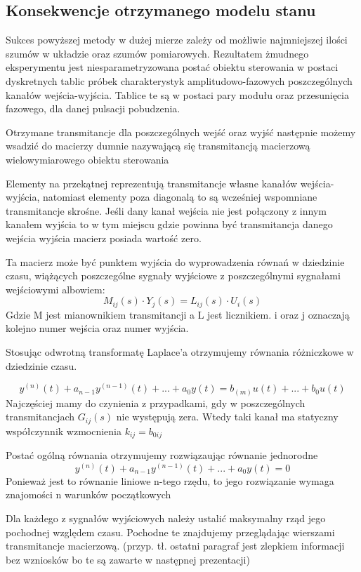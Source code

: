 \documentclass{article}
\begin{document}
	\subsection{Konsekwencje otrzymanego modelu stanu}

		Sukces powyższej metody w dużej mierze zależy od możliwie najmniejszej ilości
		szumów w układzie oraz szumów pomiarowych. Rezultatem żmudnego eksperymentu
		jest niesparametryzowana postać obiektu sterowania w postaci dyskretnych tablic
		próbek charakterystyk amplitudowo-fazowych poszczególnych kanałów wejścia-wyjścia.
		Tablice te są w postaci pary modułu oraz przesunięcia fazowego, dla danej pulsacji
		pobudzenia.

		Otrzymane transmitancje dla poszczególnych wejść oraz wyjść następnie możemy
		wsadzić do macierzy dumnie nazywającą się transmitancją macierzową
		wielowymiarowego obiektu sterowania

		Elementy na przekątnej reprezentują transmitancje własne kanałów
		wejścia-wyjścia, natomiast elementy poza diagonalą to są
		wcześniej wspomniane transmitancje skrośne. Jeśli dany kanał wejścia nie jest
		połączony z innym kanałem wyjścia to w tym miejscu gdzie powinna być
		transmitancja danego wejścia wyjścia macierz posiada wartość zero.

		Ta macierz może być punktem wyjścia do wyprowadzenia równań w dziedzinie czasu,
		wiążących poszczególne sygnały wyjściowe z poszczególnymi sygnałami wejściowymi albowiem:
		\begin{equation}
			 M_{ij}(s) \cdot Y_{j}(s) = L_{ij}(s) \cdot U_{i}(s) 
		\end{equation}
		Gdzie M jest mianownikiem transmitancji a L jest licznikiem.
		i oraz j oznaczają kolejno numer wejścia oraz numer wyjścia.

		Stosując odwrotną transformatę Laplace'a otrzymujemy równania różniczkowe w
		dziedzinie czasu.

		\begin{equation}
			y^{(n)}(t) + a_{n-1} y^{(n-1)}(t) + ... +   a_{0} y(t) = b_{(m)} u(t) + ... + b_{0} u(t)
		\end{equation}
		Najczęściej mamy do czynienia z przypadkami, gdy w poszczególnych
		transmitancjach $G_{ij}(s)$ nie występują zera.
		Wtedy taki kanał ma statyczny współczynnik wzmocnienia $k_{ij} = b_{0 ij}$

		Postać ogólną równania otrzymujemy rozwiązaując równanie jednorodne
		\begin{equation}
			y^{(n)}(t) + a_{n-1} y^{(n-1)}(t) + ... +   a_{0} y(t) = 0
		\end{equation}
		Ponieważ jest to równanie liniowe n-tego rzędu, to jego rozwiązanie wymaga znajomości
		n warunków początkowych

		Dla każdego z sygnałów wyjściowych należy ustalić maksymalny rząd jego
		pochodnej względem czasu. Pochodne te znajdujemy przeglądając wierszami
		transmitancje macierzową.
		(przyp. tł. ostatni paragraf jest zlepkiem informacji bez wzniosków bo te
		są zawarte w następnej prezentacji)
\end{document}
